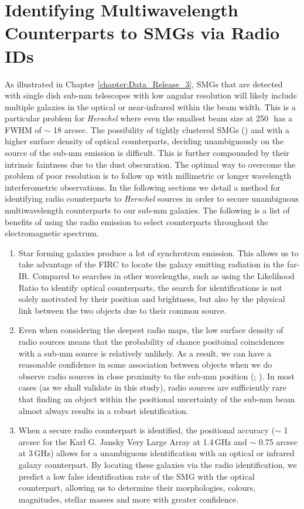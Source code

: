 \section{Identifying Multiwavelength Counterparts to SMGs via Radio IDs}

As illustrated in Chapter \ref{chapter:Data_Release_3}, SMGs that are detected with single dish sub-mm telescopes with low angular resolution will likely include multiple galaxies in the optical or near-infrared within the beam width. This is a particular problem for \textit{Herschel} where even the smallest beam size at 250\,\micron\ has a FWHM of $\sim$ 18 arcsec. The possibility of tightly clustered SMGs (\citealt{Blain_2004}) and with a higher surface density of optical counterparts, deciding unambiguously on the source of the sub-mm emission is difficult. This is further compounded by their intrinsic faintness due to the dust obscuration. The optimal way to overcome the problem of poor resolution is to follow up with millimetric or longer wavelength interferometric observations. In the following sections we detail a method for identifying radio counterparts to \textit{Herschel} sources in order to secure unambiguous multiwavelength counterparts to our sub-mm galaxies. The following is a list of benefits of using the radio emission to select counterparts throughout the electromagnetic spectrum.

\begin{enumerate}
    \item Star forming galaxies produce a lot of synchrotron emission. This allows us to take advantage of the FIRC to locate the galaxy emitting radiation in the far-IR. Compared to searches in other wavelengths, such as using the Likelihood Ratio to identify optical counterparts, the search for identifications is not solely motivated by their position and brightness, but also by the physical link between the two objects due to their common source.
    \item Even when considering the deepest radio maps, the low surface density of radio sources means that the probability of chance positoinal coincidences with a sub-mm source is relatively unlikely. As a result, we can have a reasonable confidence in some association between objects when we do observe radio sources in close proximity to the sub-mm position (\citealt{Ivison_2002}; \citealt{Borys_2004}). In most cases (as we shall validate in this study), radio sources are sufficiently rare that finding an object within the positional uncertainty of the sub-mm beam almost always results in a robust identification.
    \item When a secure radio counterpart is identified, the positional accuracy ($\sim$ 1 arcsec for the Karl G. Jansky Very Large Array at 1.4\,GHz and $\sim$ 0.75 arcsec at 3\,GHz) allows for a unambiguous identification with an optical or infrared galaxy counterpart. By locating these galaxies via the radio identification, we predict a low false identification rate of the SMG with the optical counterpart, allowing us to determine their morphologies, colours, magnitudes, stellar masses and more with greater confidence.
\end{enumerate}

